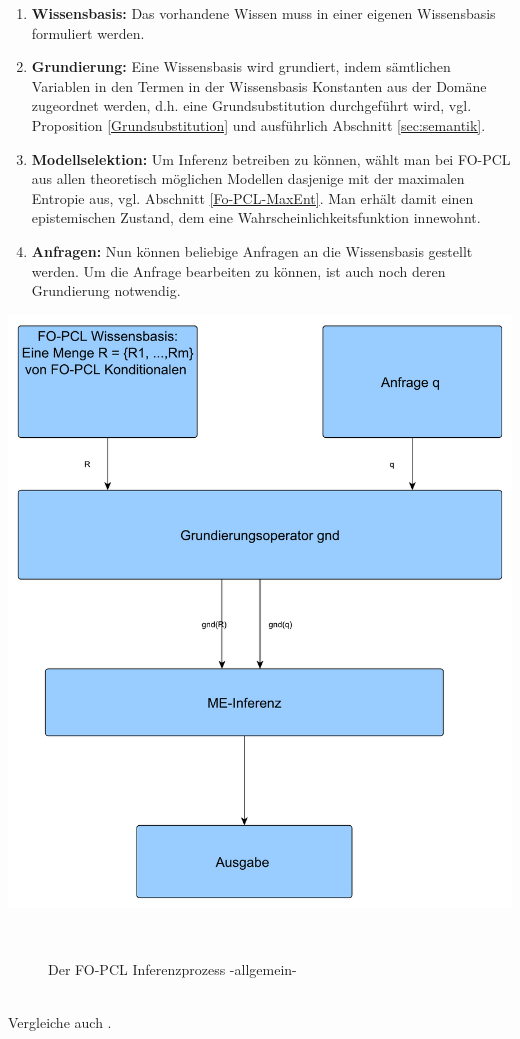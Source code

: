 \documentclass[a4paper, 11pt]{book}
\begin{document}
\begin{enumerate}
	
\item \textbf{Wissensbasis:} 
Das vorhandene Wissen muss in einer eigenen Wissensbasis formuliert werden.
\item \textbf{Grundierung:}
Eine Wissensbasis wird grundiert, indem sämtlichen Variablen in den Termen in der Wissensbasis Konstanten aus der Domäne zugeordnet werden, d.h. eine Grundsubstitution durchgeführt wird, vgl. Proposition  \ref{Grundsubstitution} und ausführlich Abschnitt \ref{sec:semantik}.
\item \textbf{Modellselektion:}
Um Inferenz betreiben zu können, wählt man bei FO-PCL aus allen theoretisch möglichen Modellen dasjenige mit der maximalen Entropie aus, vgl. Abschnitt \ref{Fo-PCL-MaxEnt}. Man erhält damit einen epistemischen Zustand, dem eine Wahrscheinlichkeitsfunktion innewohnt.
\item \textbf{Anfragen:}
Nun können beliebige Anfragen an die Wissensbasis gestellt werden. Um die Anfrage bearbeiten zu können, ist auch noch deren Grundierung notwendig. 

\end{enumerate}
\newpage
\includegraphics[scale = 0.5]{Graphics/FO-PCL_Inferenzprozess}
\begin{figure}[h]
	\caption{Der FO-PCL Inferenzprozess -allgemein- }\
\end{figure}
\\
Vergleiche auch \cite{BHM14}.
\end{document}
